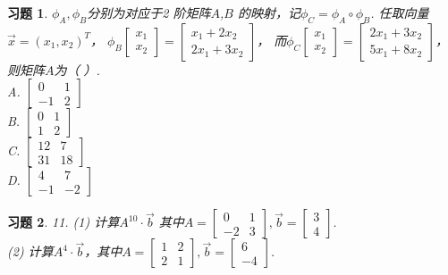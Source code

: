 \documentclass[a4paper]{book}
\newtheorem{ex}{习题}[chapter]
\begin{document}
\begin{ex}\label{8.10}
$\phi_A,\phi_B$分别为对应于2 阶矩阵$A$,$B$ 的映射，记$\phi_C=\phi_A\circ\phi_B$. 任取向量$\vec{x}=(x_1,x_2 )^T$，
$\phi_B\begin{bmatrix}x_1\\x_2\end{bmatrix}=\begin{bmatrix}x_1+2x_2\\2x_1+3x_2\end{bmatrix}$，
而$\phi_C\begin{bmatrix}x_1\\x_2\end{bmatrix}=\begin{bmatrix}2x_1+3x_2\\5x_1+8x_2\end{bmatrix}$，则矩阵$A$为（     ）.\\
A.  $\begin{bmatrix}0&1\\-1&2\end{bmatrix}$\\
B.  $\begin{bmatrix}0&1\\1&2\end{bmatrix}$\\
C.  $\begin{bmatrix}12&7\\31&18\end{bmatrix}$\\
D.  $\begin{bmatrix}4&7\\-1&-2\end{bmatrix}$
\end{ex}

\begin{ex}\label{8.11}
11. (1) 计算$A^{10}\cdot\vec{b}$ 其中$A=\begin{bmatrix}0&1\\-2&3\end{bmatrix},\vec{b}=\begin{bmatrix}3\\4\end{bmatrix}$.\\
(2) 计算$A^4\cdot\vec{b}$，其中$A=\begin{bmatrix}1&2\\2&1\end{bmatrix},\vec{b}=\begin{bmatrix}6\\-4\end{bmatrix}$.
\end{ex}
\end{document}
